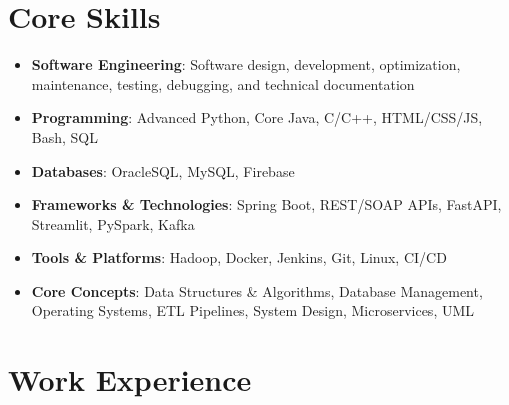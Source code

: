 \documentclass[a4paper,10pt]{article}
\begin{document}
\section{Core Skills}
\begin{itemize}[leftmargin=*, itemsep=-5pt]
    \item \textbf{Software Engineering}: Software design, development, optimization, maintenance, testing, debugging, and technical documentation
    \item \textbf{Programming}: Advanced Python, Core Java, C/C++, HTML/CSS/JS, Bash, SQL
    \item \textbf{Databases}: OracleSQL, MySQL, Firebase
    \item \textbf{Frameworks \& Technologies}: Spring Boot, REST/SOAP APIs, FastAPI, Streamlit, PySpark, Kafka
    \item \textbf{Tools \& Platforms}: Hadoop, Docker, Jenkins, Git, Linux, CI/CD
    \item \textbf{Core Concepts}: Data Structures \& Algorithms, Database Management, Operating Systems, ETL Pipelines, System Design, Microservices, UML
\end{itemize}

\section{Work Experience}
\end{document}
